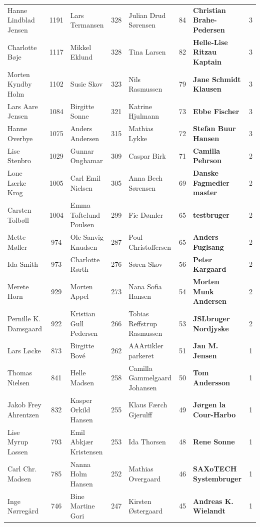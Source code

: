 \begin{table}[h]
\begin{tabular}{l|c|l|c|l|c|l|c}
		Hanne Lindblad Jensen & 1191 & Lars Termansen & 328 & Julian Drud Sørensen & 84 & \textbf{Christian Brahe-Pedersen} & 3 \\
		Charlotte Bøje & 1117 & Mikkel Eklund & 328 & Tina Larsen & 82 & \textbf{Helle-Lise Ritzau Kaptain} & 3 \\
		Morten Kyndby Holm & 1102 & Susie Skov & 323 & Nils Rasmussen & 79 & \textbf{Jane Schmidt Klausen} & 3 \\
		Lars Aare Jensen & 1084 & Birgitte Sonne & 321 & Katrine Hjulmann & 73 & \textbf{Ebbe Fischer} & 3 \\
		Hanne Overbye & 1075 & Anders Andersen & 315 & Mathias Lykke & 72 & \textbf{Stefan Buur Hansen} & 3 \\
		Lise Stenbro & 1029 & Gunnar Onghamar & 309 & Caspar Birk & 71 & \textbf{Camilla Pehrson} & 2 \\
		Lone Lærke Krog & 1005 & Carl Emil Nielsen & 305 & Anna Bech Sørensen & 69 & \textbf{Danske Fagmedier master} & 2 \\
		Carsten Tolbøll & 1004 & Emma Toftelund Poulsen & 299 & Fie Dømler & 65 & \textbf{testbruger} & 2 \\
		Mette Møller & 974 & Ole Sanvig Knudsen & 287 & Poul Christoffersen & 65 & \textbf{Anders Fuglsang} & 2 \\
		Ida Smith & 973 & Charlotte Rørth & 276 & Søren Skov & 56 & \textbf{Peter Kargaard} & 2 \\
		Merete Horn & 929 & Morten Appel & 273 & Nana Sofia Hansen & 54 & \textbf{Morten Munk Andersen} & 2 \\
		Pernille K. Damsgaard & 922 & Kristian Gull Pedersen & 266 & Tobias Reffstrup Rasmussen & 53 & \textbf{JSLbruger Nordjyske} & 2 \\
		Lars Løcke & 873 & Birgitte Bové & 262 & AAArtikler parkeret & 51 & \textbf{Jan M. Jensen} & 1 \\
		Thomas Nielsen & 841 & Helle Madsen & 258 & Camilla Gammelgaard Johansen & 50 & \textbf{Tom Andersson} & 1 \\
		Jakob Frey Ahrentzen & 832 & Kasper Orkild Hansen & 255 & Klaus Færch Gjerulff & 49 & \textbf{Jørgen la Cour-Harbo} & 1 \\
		Lise Myrup Lassen & 793 & Emil Abkjær Kristensen & 253 & Ida Thorsen & 48 & \textbf{Rene Sonne} & 1 \\
		Carl Chr. Madsen & 785 & Nanna Holm Hansen & 252 & Mathias Overgaard & 46 & \textbf{SAXoTECH Systembruger} & 1 \\
		Inge Nørregård & 746 & Bine Martine Gori & 247 & Kirsten Østergaard & 45 & \textbf{Andreas K. Wielandt} & 1 \\

\end{tabular}
\end{table}
